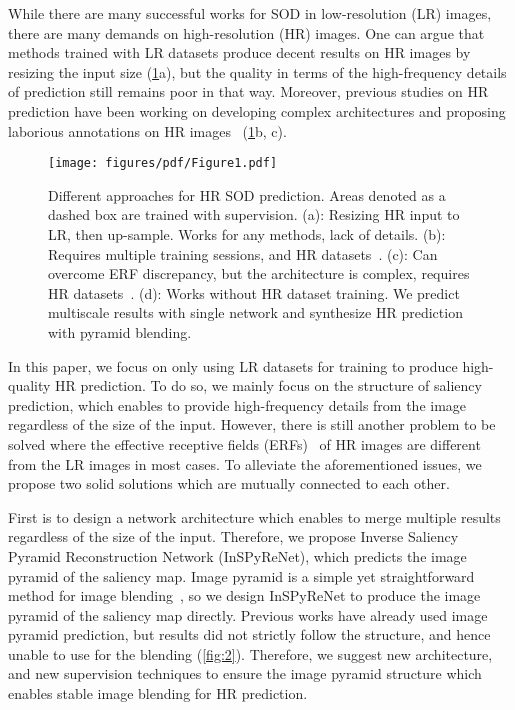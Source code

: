 \documentclass{llncs}
\begin{document}
    While there are many successful works for SOD in low-resolution (LR) images, there are many demands on high-resolution (HR) images.
    One can argue that methods trained with LR datasets produce decent results on HR images by resizing the input size (\cref{fig:1}a), 
    but the quality in terms of the high-frequency details of prediction still remains poor in that way.
    Moreover, previous studies on HR prediction have been working on developing complex architectures and proposing laborious annotations on HR images~\cite{zeng2019towards, tang2021disentangled, zhang2021looking, xie2022pyramid} (\cref{fig:1}b, c). 
    \begin{figure}
    \centering
    \texttt{[image: figures/pdf/Figure1.pdf]} 
    \caption{Different approaches for HR SOD prediction. Areas denoted as a dashed box are trained with supervision.
    (a): Resizing HR input to LR, then up-sample. Works for any methods, lack of details. 
    (b): Requires multiple training sessions, and HR datasets~\cite{zeng2019towards,tang2021disentangled}. 
    (c): Can overcome ERF discrepancy, but the architecture is complex, requires HR datasets~\cite{xie2022pyramid}.
    (d): Works without HR dataset training. We predict multiscale results with single network and synthesize HR prediction with pyramid blending.}
    \label{fig:1}
\end{figure} 
    In this paper, we focus on only using LR datasets for training to produce high-quality HR prediction.
    To do so, we mainly focus on the structure of saliency prediction, which enables to provide high-frequency details from the image regardless of the size of the input.
    However, there is still another problem to be solved where the effective receptive fields (ERFs)~\cite{luo2016understanding} of HR images are different from the LR images in most cases.
    To alleviate the aforementioned issues, we propose two solid solutions which are mutually connected to each other.
    
    First is to design a network architecture which enables to merge multiple results regardless of the size of the input.
    Therefore, we propose Inverse Saliency Pyramid Reconstruction Network (InSPyReNet), which predicts the image pyramid of the saliency map. 
    Image pyramid is a simple yet straightforward method for image blending~\cite{burt1983mosaics}, so we design InSPyReNet to produce the image pyramid of the saliency map directly.
    Previous works have already used image pyramid prediction, but results did not strictly follow the structure, and hence unable to use for the blending (\cref{fig:2}). 
    Therefore, we suggest new architecture, and new supervision techniques to ensure the image pyramid structure which enables stable image blending for HR prediction.
    
\end{document}
